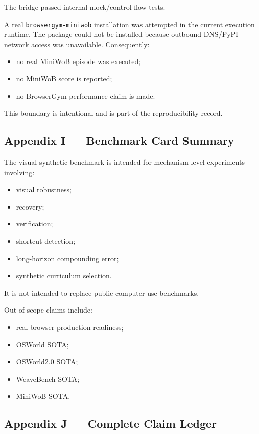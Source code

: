 \documentclass[
]{article}
\providecommand{\tightlist}{%
  \setlength{\itemsep}{0pt}\setlength{\parskip}{0pt}}
\begin{document}
The bridge passed internal mock/control-flow tests.

A real \texttt{browsergym-miniwob} installation was attempted in the
current execution runtime. The package could not be installed because
outbound DNS/PyPI network access was unavailable. Consequently:

\begin{itemize}
\tightlist
\item
  no real MiniWoB episode was executed;
\item
  no MiniWoB score is reported;
\item
  no BrowserGym performance claim is made.
\end{itemize}

This boundary is intentional and is part of the reproducibility record.

\subsection{Appendix I --- Benchmark Card
Summary}\label{appendix-i-benchmark-card-summary}

The visual synthetic benchmark is intended for mechanism-level
experiments involving:

\begin{itemize}
\tightlist
\item
  visual robustness;
\item
  recovery;
\item
  verification;
\item
  shortcut detection;
\item
  long-horizon compounding error;
\item
  synthetic curriculum selection.
\end{itemize}

It is not intended to replace public computer-use benchmarks.

Out-of-scope claims include:

\begin{itemize}
\tightlist
\item
  real-browser production readiness;
\item
  OSWorld SOTA;
\item
  OSWorld2.0 SOTA;
\item
  WeaveBench SOTA;
\item
  MiniWoB SOTA.
\end{itemize}

\subsection{Appendix J --- Complete Claim
Ledger}\label{appendix-j-complete-claim-ledger}
\end{document}
